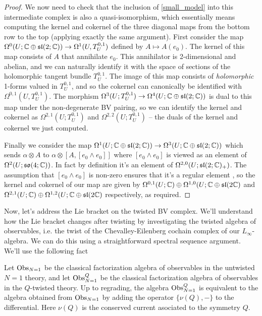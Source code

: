 \documentclass[10pt, oneside]{article}
\begin{document}
\begin{proof}
We now need to check that the inclusion of \ref{small_model} into this intermediate complex is also a quasi-isomorphism, which essentially means computing the kernel and cokernel of the three diagonal maps from the bottom row to the top (applying exactly the same argument).  First consider the map $\Omega^0(U; \mathbb{C} \oplus \mathfrak{sl}(2;\mathbb{C})) \to \Omega^1(U, T^{0,1}_U)$ defined by $A \mapsto A(e_0)$.  The kernel of this map consists of $A$ that annihilate $e_0$.  This annihilator is 2-dimensional and abelian, and we can naturally identify it with the space of sections of the holomorphic tangent bundle $T^{0,1}_U$.  The image of this map consists of \emph{holomorphic} 1-forms valued in $T^{0,1}_U$, and so the cokernel can canonically be identified with $\Omega^{0,1}(U, T^{0,1}_U)$.  The morphism $\Omega^3(U; T^{0,1}_U) \to \Omega^4(U; \mathbb{C} \oplus \mathfrak{sl}(2;\mathbb{C}))$ is dual to this map under the non-degenerate BV pairing, so we can identify the kernel and cokernel as $\Omega^{2,1}(U; T^{0,1}_U)$ and $\Omega^{2,2}(U; T^{0,1}_U)$ -- the duals of the kernel and cokernel we just computed.

Finally we consider the map $\Omega^1(U; \mathbb{C} \oplus \mathfrak{sl}(2;\mathbb{C})) \to \Omega^3(U; \mathbb{C} \oplus \mathfrak{sl}(2;\mathbb{C}))$ which sends $\alpha \otimes A$ to $\alpha \otimes [A, [e_0 \wedge e_0]]$ where $[e_0 \wedge e_0]$ is viewed as an element of $\Omega^2(U; \mathfrak{so}(4;\mathbb{C}))$.  In fact by definition it's an element of $\Omega^{2,0}(U; \mathfrak{sl}(2;\mathbb{C})_+)$.  The assumption that $[e_0 \wedge e_0]$ is non-zero ensures that it's a regular element , so the kernel and cokernel of our map are given by $\Omega^{0,1}(U;\mathbb{C}) \oplus \Omega^{1,0}(U; \mathbb{C} \oplus \mathfrak{sl}(2\mathbb{C})$ and$\Omega^{2,1}(U;\mathbb{C}) \oplus \Omega^{1,2}(U; \mathbb{C} \oplus \mathfrak{sl}(2\mathbb{C})$ respectively, as required.
\end{proof}

Now, let's address the Lie bracket on the twisted BV complex.  We'll understand how the Lie bracket changes after twisting by investigating the twisted algebra of observables, i.e. the twist of the Chevalley-Eilenberg cochain complex of our $L_\infty$-algebra.  We can do this using a straightforward spectral sequence argument.  We'll use the following fact 

\begin{prop} \label{twisted_observables_prop}
Let $\mathrm{Obs}_{N=1}$ be the classical factorization algebra of observables in the untwisted $N=1$ theory, and let $\mathrm{Obs}_{N=1}^Q$ be the classical factorization algebra of observables in the $Q$-twisted theory.  Up to regrading, the algebra $\mathrm{Obs}_{N=1}^Q$ is equivalent to the algebra obtained from $\mathrm{Obs}_{N=1}$ by adding the operator $\{\nu(Q),-\}$ to the differential.  Here $\nu(Q)$ is the conserved current asociated to the symmetry $Q$.
\end{prop}
\end{document}
